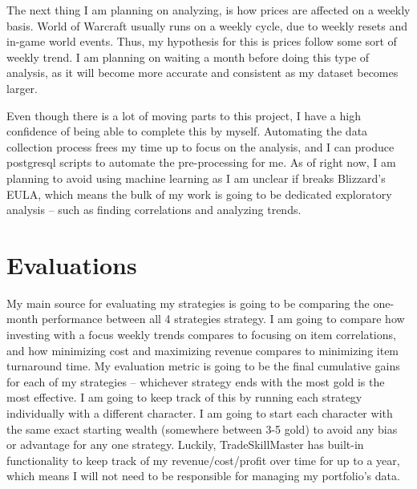 \documentclass[sigconf]{acmart}
\begin{document}
The next thing I am planning on analyzing, is how prices are affected on a weekly basis. World of Warcraft usually runs on a weekly cycle, due to weekly resets and in-game world events. Thus, my hypothesis for this is prices follow some sort of weekly trend. I am planning on waiting a month before doing this type of analysis, as it  will become more accurate and consistent as my dataset becomes larger.

Even though there is a lot of moving parts to this project, I have a high confidence of being able to complete this by myself. Automating the data collection process frees my time up to focus on the analysis, and I can produce postgresql scripts to automate the pre-processing for me. As of right now, I am planning to avoid using machine learning as I am unclear if breaks Blizzard’s EULA, which means the bulk of my work is going to be dedicated exploratory analysis – such as finding correlations and analyzing trends.

\section{Evaluations}
My main source for evaluating my strategies is going to be comparing the one-month performance between all 4 strategies strategy. I am going to compare how investing with a focus weekly trends compares to focusing on item correlations, and how minimizing cost and maximizing revenue compares to minimizing item turnaround time. My evaluation metric is going to be the final cumulative gains for each of my strategies – whichever strategy ends with the most gold is the most effective. I am going to keep track of this by running each strategy individually with a different character. I am going to start each character with the same exact starting wealth (somewhere between 3-5 gold) to avoid any bias or advantage for any one strategy. Luckily, TradeSkillMaster has built-in functionality to keep track of my revenue/cost/profit over time for up to a year, which means I will not need to be responsible for managing my portfolio’s data.
\end{document}
